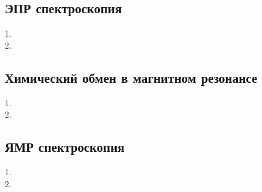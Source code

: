 \subsection{ЭПР спектроскопия}
1. \\
2. 
\newpage

\subsection{Химический обмен в магнитном резонансе}
1. \\
2. 
\newpage

\subsection{ЯМР спектроскопия}
1. \\
2. 
\newpage
